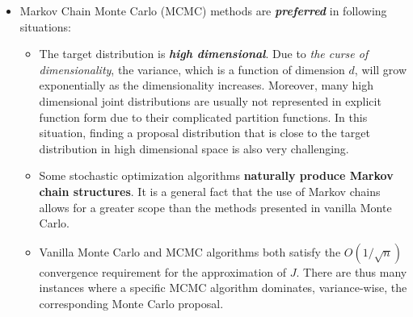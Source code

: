 \documentclass[11pt]{article}
\begin{document}
\begin{itemize}
\item  Markov Chain Monte Carlo (MCMC) methods are \emph{\textbf{preferred}} in following situations:
\begin{itemize}
\item The target distribution is \emph{\textbf{high dimensional}}. Due to \emph{the curse of dimensionality}, the variance, which is a function of dimension $d$, will grow exponentially as the dimensionality increases. Moreover, many high dimensional joint distributions are usually not represented in explicit function form due to their complicated partition functions. In this situation, finding a proposal distribution that is close to the target distribution in high dimensional space is also very challenging.

\item Some stochastic optimization algorithms \textbf{naturally produce Markov chain structures}. It is a general fact that the use of Markov chains allows for a greater scope than the methods presented in vanilla Monte Carlo.

\item Vanilla Monte Carlo and MCMC algorithms both satisfy the $O(1/\sqrt{n})$ convergence requirement for the approximation of $J$. There are thus many instances where a specific MCMC algorithm dominates, variance-wise, the corresponding Monte Carlo proposal. 
\end{itemize}
\end{itemize}
\end{document}
